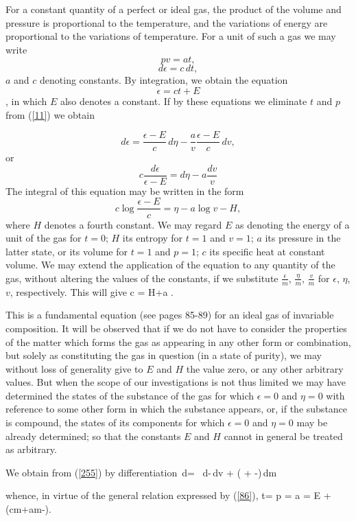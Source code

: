 \documentclass[12pt]{article}
\begin{document}
For a constant quantity of a perfect or ideal gas, the product of the volume and pressure is proportional to the temperature, and the variations of energy are proportional to the variations of temperature. For a unit of such a gas we may write
$$pv = at,$$
$$d\epsilon = c\,dt,$$
$a$ and $c$ denoting constants. By integration, we obtain the equation
$$\epsilon = ct+E$$,
in which $E$ also denotes a constant. If by these equations we eliminate $t$ and $p$ from (\ref{11}) we obtain

$$d \epsilon = \frac{\epsilon -E}{c}\,d\eta-\frac{a}{v}\frac{\epsilon -E}{c}\,dv,$$
or   $$  c\frac{d\epsilon}{\epsilon-E}=d\eta -a\frac{dv}{v} $$
The integral of this equation may be written in the form
$$c \log \frac{\epsilon -E}{c} = \eta -a \log v - H,$$
where $H$ denotes a fourth constant. We may regard $E$ as denoting the energy of a unit of the gas for $t=0$; $H$ its entropy for $t= 1$ and $v= 1$; $a$ its pressure in the latter state, or its volume for $t =1$ and $p= 1$; $c$ its specific heat at constant volume. We may extend the application of the equation to any quantity of the gas, without altering the values of the constants, if we substitute $\frac{\epsilon}{m}$, $\frac{\eta}{m}$, $\frac{v}{m}$ for $\epsilon$, $\eta$, $v$, respectively. This will give
\eqs c \log {}= H+a \log{} . \label{255}\eqe

This is a fundamental equation (see pages 85-89) for an ideal gas of invariable composition. It will be observed that if we do not have to consider the properties of the matter which forms the gas as appearing in any other form or combination, but solely as constituting the gas in question (in a state of purity), we may without loss of generality give to $E$ and $H$ the value zero, or any other arbitrary values. But when the scope of our investigations is not thus limited we may have determined the states of the substance of the gas for which $\epsilon=0$ and $\eta = 0$ with reference to some other form in which the substance appears, or, if the substance is compound, the states of its components for which $\epsilon=0$ and $\eta = 0$ may be already determined; so that the constants $E$ and $H$ cannot in general be treated as arbitrary.


We obtain from (\ref{255}) by differentiation
\eqs 
{}\,d\epsilon=  \, d\eta -\,dv + 
\left( + -\right)\,dm  
\label{256}\eqe

whence, in virtue of the general relation expressed by (\ref{86}),
\eqs t=\label{257}\eqe
\eqs p = a    \label{258}\eqe
\eqs  \mu = E +  (cm+am-\eta).   \label{259}\eqe
\end{document}
